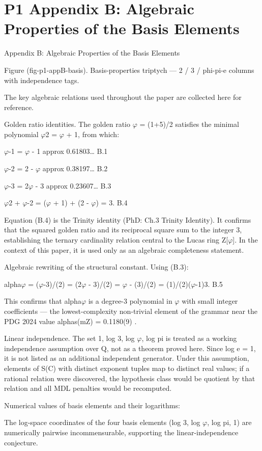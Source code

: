 
\section{P1 Appendix B: Algebraic Properties of the Basis Elements}

Appendix B: Algebraic Properties of the Basis Elements

                 Figure (fig-p1-appB-basis). Basis-properties triptych --- 2 / 3 / phi-pi-e columns with
                                                 independence tags.

  The key algebraic relations used throughout the paper are collected here for reference.

  Golden ratio identities. The golden ratio $\varphi$ = (1+5)/2 satisfies the minimal polynomial
  $\varphi$2 = $\varphi$ + 1, from which:

  $\varphi$-1 = $\varphi$ - 1 approx 0.61803… B.1

  $\varphi$-2 = 2 - $\varphi$ approx 0.38197… B.2

  $\varphi$-3 = 2$\varphi$ - 3 approx 0.23607… B.3

  $\varphi$2 + $\varphi$-2 = ($\varphi$ + 1) + (2 - $\varphi$) = 3. B.4

  Equation (B.4) is the Trinity identity (PhD: Ch.3 Trinity Identity). It confirms that the
  squared golden ratio and its reciprocal square sum to the integer 3, establishing the
  ternary cardinality relation central to the Lucas ring Z[$\varphi$]. In the context of this paper, it
  is used only as an algebraic completeness statement.

  Algebraic rewriting of the structural constant. Using (B.3):

  alpha$\varphi$ = ($\varphi$-3)/(2) = (2$\varphi$ - 3)/(2) = $\varphi$ - (3)/(2) = (1)/(2)($\varphi$-1)3. B.5

  This confirms that alpha$\varphi$ is a degree-3 polynomial in $\varphi$ with small integer coefficients
  --- the lowest-complexity non-trivial element of the grammar near the PDG 2024 value
  alphas(mZ) = 0.1180(9) \citep{pdg2024}.

  Linear independence. The set {1, log 3, log $\varphi$, log pi} is treated as a working
  independence assumption over Q, not as a theorem proved here. Since log e = 1, it is
  not listed as an additional independent generator. Under this assumption, elements of
  S(C) with distinct exponent tuples map to distinct real values; if a rational relation were
  discovered, the hypothesis class would be quotient by that relation and all MDL
  penalties would be recomputed.

  Numerical values of basis elements and their logarithms:

  The log-space coordinates of the four basis elements (log 3, log $\varphi$, log pi, 1) are
  numerically pairwise incommensurable, supporting the linear-independence conjecture.

